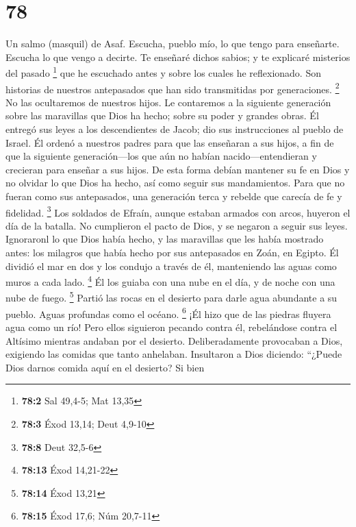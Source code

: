 \hypertarget{section-77}{%
\section{78}\label{section-77}}

Un salmo (masquil) de Asaf.  Escucha, pueblo mío, lo que
tengo para enseñarte. Escucha lo que vengo a decirte.  Te
enseñaré dichos sabios; y te explicaré misterios del pasado \footnote{\textbf{78:2}
  Sal 49,4-5; Mat 13,35}  que he escuchado antes y sobre los
cuales he reflexionado. Son historias de nuestros antepasados que han
sido transmitidas por generaciones. \footnote{\textbf{78:3} Éxod 13,14;
  Deut 4,9-10}  No las ocultaremos de nuestros hijos. Le
contaremos a la siguiente generación sobre las maravillas que Dios ha
hecho; sobre su poder y grandes obras.  Él entregó sus leyes
a los descendientes de Jacob; dio sus instrucciones al pueblo de Israel.
Él ordenó a nuestros padres para que las enseñaran a sus hijos,
 a fin de que la siguiente generación---los que aún no
habían nacido---entendieran y crecieran para enseñar a sus hijos.
 De esta forma debían mantener su fe en Dios y no olvidar lo
que Dios ha hecho, así como seguir sus mandamientos.  Para
que no fueran como sus antepasados, una generación terca y rebelde que
carecía de fe y fidelidad. \footnote{\textbf{78:8} Deut 32,5-6}
 Los soldados de Efraín, aunque estaban armados con arcos,
huyeron el día de la batalla.  No cumplieron el pacto de
Dios, y se negaron a seguir sus leyes.  Ignoraronl lo que
Dios había hecho, y las maravillas que les había mostrado antes:
 los milagros que había hecho por sus antepasados en Zoán,
en Egipto.  Él dividió el mar en dos y los condujo a través
de él, manteniendo las aguas como muros a cada lado. \footnote{\textbf{78:13}
  Éxod 14,21-22}  Él los guiaba con una nube en el día, y
de noche con una nube de fuego. \footnote{\textbf{78:14} Éxod 13,21}
 Partió las rocas en el desierto para darle agua abundante
a su pueblo. Aguas profundas como el océano. \footnote{\textbf{78:15}
  Éxod 17,6; Núm 20,7-11}  ¡Él hizo que de las piedras
fluyera agua como un río!  Pero ellos siguieron pecando
contra él, rebelándose contra el Altísimo mientras andaban por el
desierto.  Deliberadamente provocaban a Dios, exigiendo las
comidas que tanto anhelaban.  Insultaron a Dios diciendo:
``¿Puede Dios darnos comida aquí en el desierto?  Si bien
